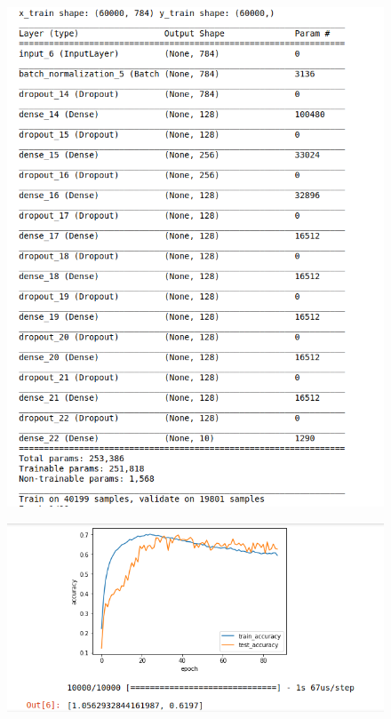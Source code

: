 \documentclass{article}
\begin{document}
\begin{enumerate}
\begin{figure}[!ht]
\begin{center}
                \includegraphics[width=1.0\textwidth]{8a.png}
            \end{center}
        \end{figure}
        \begin{figure}[!ht]
            \begin{center}
                \includegraphics[width=1.0\textwidth]{8b.png}
            \end{center}
        \end{figure}
        \clearpage
\end{enumerate}
\end{document}
